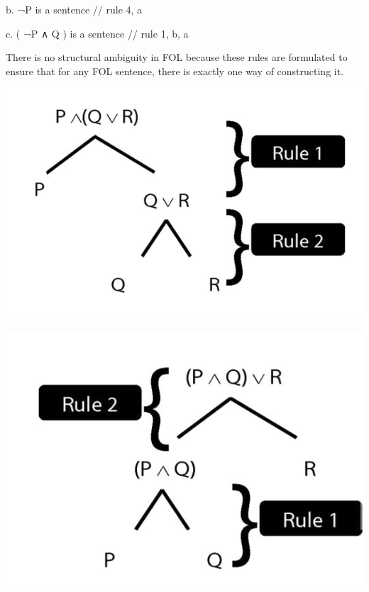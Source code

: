 \documentclass[12pt]{extarticle}
\begin{document}
\begin{multicols*}{3}
b. ¬P is a sentence // rule 4, a
 
c. ( ¬P ∧ Q ) is a sentence // rule 1, b, a
 
There is no structural ambiguity in FOL because these rules are formulated to ensure that for any FOL sentence, there is exactly one way of constructing it.
 
\begin{center}
\includegraphics[scale=0.3]{img/unit_230_tree1.png}
\end{center}
\begin{center}
\includegraphics[scale=0.3]{img/unit_230_tree2.png}
\end{center}
\begin{center}

\end{center}
\end{multicols*}
\end{document}
